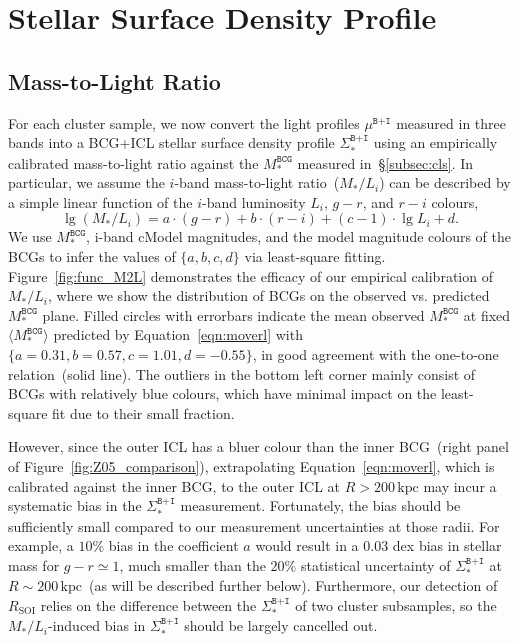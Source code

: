 \documentclass[fleqn,usenatbib]{mnras}
\newcommand{\rsoi}{R_{\mathrm{SOI}}}
\newcommand{\sigbi}{\Sigma_*^{\texttt{B+I}}}
\newcommand{\mubi}{\mu^{\texttt{B+I}}}
\newcommand{\msbcg}{M_*^{\texttt{BCG}}}
\newcommand{\kpc}{\mathrm{kpc}}
\providecommand{\DIFaddend}{} %
\DeclareRobustCommand{\DIFaddend}{\DIFOaddend \let\includegraphics\DIFOincludegraphics} %
\begin{document}
\DIFaddend \section{Stellar Surface Density Profile}
\label{sec:sigma}

\subsection{Mass-to-Light Ratio}
\label{subsec:moverl}



For each cluster sample, we now convert the light profiles $\mubi$ measured
in three bands into a BCG+ICL stellar surface density profile $\sigbi$
using an empirically calibrated mass-to-light ratio against the $\msbcg$
measured in~\S\ref{subsec:cls}.  In particular, we assume the $i$-band
mass-to-light ratio~($M_*/L_i$) can be described by a simple linear
function of the $i$-band luminosity $L_i$, $g{-}r$, and $r{-}i$ colours,
\begin{equation}
    \lg(M_{\ast}/L_{i}) = a \cdot (g-r) + b \cdot (r-i) + (c - 1) \cdot \lg L_{i} + d.
    \label{eqn:moverl}
\end{equation}
We use $\msbcg$, i-band cModel magnitudes, and the model magnitude colours
of the BCGs to infer the values of $\{a, b, c, d\}$ via least-square
fitting. Figure~\ref{fig:func_M2L} demonstrates the efficacy of our
empirical calibration of $M_*/L_i$, where we show the distribution of BCGs
on the observed vs. predicted $\msbcg$ plane. Filled circles with errorbars
indicate the mean observed $\msbcg$ at fixed $\langle\msbcg\rangle$
predicted by Equation~\ref{eqn:moverl} with $\{a{=}0.31, b{=}0.57,
c{=}1.01, d{=}{-}0.55\}$, in good agreement with the one-to-one
relation~(solid line). The outliers in the bottom left corner mainly
consist of BCGs with relatively blue colours, which have minimal impact on
the least-square fit due to their small fraction.


However, since the outer ICL has a bluer colour than the inner BCG~(right
panel of Figure~\ref{fig:Z05_comparison}), extrapolating
Equation~\ref{eqn:moverl}, which is calibrated against the inner BCG, to
the outer ICL at $R{>}200\,\kpc$ may incur a systematic bias in the
$\sigbi$ measurement.  Fortunately, the bias should be sufficiently small
compared to our measurement uncertainties at those radii. For example, a
$10\%$ bias in the coefficient $a$ would result in a $0.03$ dex bias in
stellar mass for $g{-}r{\simeq}1$, much smaller than the $20\%$ statistical
uncertainty of $\sigbi$ at $R{\sim}200\,\kpc$~(as will be described further
below). Furthermore, our detection of $\rsoi$ relies on the difference
between the $\sigbi$ of two cluster subsamples, so the $M_*/L_i$-induced
bias in $\sigbi$ should be largely cancelled out.
\end{document}
